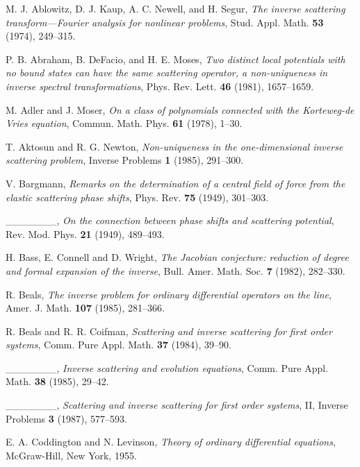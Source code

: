 \documentclass{surv-l}
\theoremstyle{plain}
\theoremstyle{definition}
\numberwithin{equation}{chapter}
\begin{document}
\def\bibname{References}
\begin{thebibliography}{AKNS}
 M. J. Ablowitz, D. J. Kaup, A. C. Newell, and H. Segur, \emph{The inverse scattering transform---Fourier analysis for nonlinear problems}, Stud. Appl. Math. \textbf{53} (1974), 249--315.

 P. B. Abraham, B. DeFacio, and H. E. Moses, \emph{Two distinct local potentials with no bound states can have the same scattering operator, a non-uniqueness in inverse spectral transformations}, Phys. Rev. Lett. \textbf{46} (1981), 1657--1659.

 M. Adler and J. Moser, \emph{On a class of polynomials connected with the Korteweg-de Vries equation}, Commun. Math. Phys. \textbf{61} (1978), 1--30.

 T. Aktosun and R. G. Newton, \emph{Non-uniqueness in the one-dimensional inverse scattering problem}, Inverse Problems \textbf{1} (1985), 291--300.

 V. Bargmann, \emph{Remarks on the determination of a central field of force from the elastic scattering phase shifts}, Phys. Rev. \textbf{75} (1949), 301--303.

 \_\_\_\_\_\_\_, \emph{On the connection between phase shifts and scattering potential}, Rev. Mod. Phys. \textbf{21} (1949), 489--493.

 H. Bass, E. Connell and D. Wright, \emph{The Jacobian conjecture: reduction of degree and formal expansion of the inverse}, Bull. Amer. Math. Soc. \textbf{7} (1982), 282--330.

 R. Beals, \emph{The inverse problem for ordinary differential operators on the line}, Amer. J. Math. \textbf{107} (1985), 281--366.

 R. Beals and R. R. Coifman, \emph{Scattering and inverse scattering for first order systems}, Comm. Pure Appl. Math. \textbf{37} (1984), 39--90.

 \_\_\_\_\_\_\_, \emph{Inverse scattering and evolution equations}, Comm. Pure Appl. Math. \textbf{38} (1985), 29--42.

 \_\_\_\_\_\_\_, \emph{Scattering and inverse scattering for first order systems}, II, Inverse Problems \textbf{3} (1987), 577--593.

 E. A. Coddington and N. Levinson, \emph{Theory of ordinary differential equations}, McGraw-Hill, New York, 1955.


\end{thebibliography}
\end{document}
